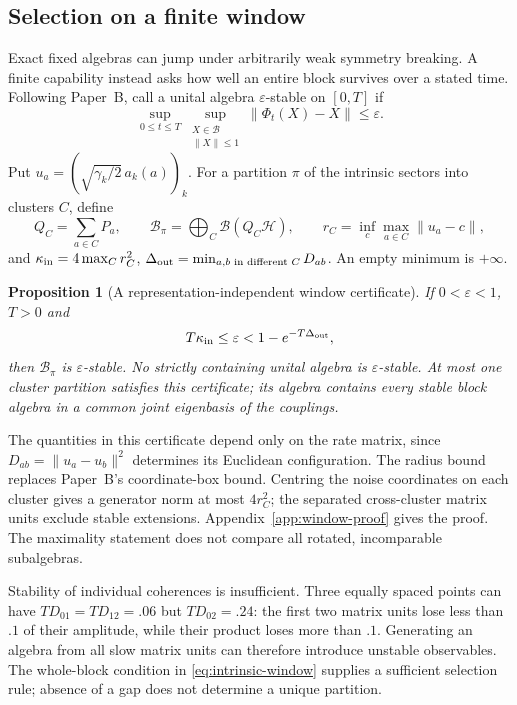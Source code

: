 \documentclass[12pt,a4paper]{article}
\newtheorem{proposition}[theorem]{Proposition}
\begin{document}
\subsection{Selection on a finite window}

Exact fixed algebras can jump under arbitrarily weak symmetry
breaking. A finite capability instead asks how well an entire block
survives over a stated time. Following Paper~B, call a unital algebra
$\varepsilon$-stable on $[0,T]$ if
\[
 \sup_{0\le t\le T}\sup_{\substack{X\in\mathcal B\\\|X\|\le1}}
       \|\Phi_t(X)-X\|\le\varepsilon .
\]
Put $u_a=(\sqrt{\gamma_k/2}\,a_k(a))_k$. For a partition $\pi$ of
the intrinsic sectors into clusters $C$, define
\[
 Q_C=\sum_{a\in C}P_a,\qquad
 \mathcal B_\pi=\bigoplus_C\mathcal B(Q_C\mathcal H),\qquad
 r_C=\inf_c\max_{a\in C}\|u_a-c\|,
\]
and $\kappa_{\rm in}=4\max_Cr_C^2$,
$\Delta_{\rm out}=\min_{a,b\text{ in different }C}D_{ab}$.
An empty minimum is $+\infty$.

\begin{proposition}[A representation-independent window certificate]
\label{prop:intrinsic-window}
If $0<\varepsilon<1$, $T>0$ and
\begin{equation}
 T\kappa_{\rm in}\le\varepsilon<1-e^{-T\Delta_{\rm out}},
 \label{eq:intrinsic-window}
\end{equation}
then $\mathcal B_\pi$ is $\varepsilon$-stable. No strictly containing
unital algebra is $\varepsilon$-stable. At most one cluster partition
satisfies this certificate; its algebra contains every stable block
algebra in a common joint eigenbasis of the couplings.
\end{proposition}

The quantities in this certificate depend only on the rate matrix,
since $D_{ab}=\|u_a-u_b\|^2$ determines its Euclidean configuration.
The radius bound replaces Paper~B's coordinate-box bound. Centring
the noise coordinates on each cluster gives a generator norm at
most $4r_C^2$; the separated cross-cluster matrix units exclude
stable extensions. Appendix~\ref{app:window-proof} gives the proof. The maximality
statement does not compare all rotated, incomparable subalgebras.

Stability of individual coherences is insufficient. Three equally
spaced points can have $TD_{01}=TD_{12}=.06$ but $TD_{02}=.24$:
the first two matrix units lose less than $.1$ of their amplitude,
while their product loses more than $.1$. Generating an algebra from
all slow matrix units can therefore introduce unstable observables.
The whole-block condition in \eqref{eq:intrinsic-window} supplies a
sufficient selection rule; absence of a gap does not determine a
unique partition.
\end{document}
